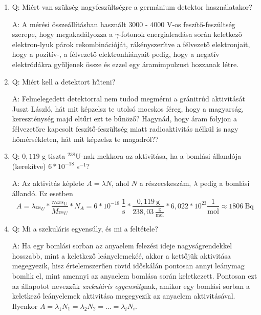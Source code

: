 \begin{enumerate}
    \item Q: Miért van szükség nagyfeszültségre a germánium detektor használatakor?
    \begin{displayquote}
        A: A mérési összeállításban használt $3000$ - $4000$ V-os feszítő-feszültség szerepe, hogy megakadályozza a $\gamma$-fotonok energialeadása során keletkező elektron-lyuk párok rekombinációját, rákényszerítve a félvezető elektronjait, hogy a pozitív-, a félvezető elektronhiányait pedig, hogy a negatív elektródákra gyűljenek össze és ezzel egy áramimpulzust hozzanak létre.
    \end{displayquote}
    
    \item Q: Miért kell a detektort hűteni?
    \begin{displayquote}
        A: Felmelegedett detektorral nem tudod megmérni a gránitrúd aktivitását Juszt László, hát mit képzelsz te utolsó mocskos féreg, hogy a magyarság, kereszténység majd eltűri ezt te bűnöző? Hagynád, hogy áram folyjon a félvezetőre kapcsolt feszítő-feszültség miatt radioaktivitás nélkül is nagy hőmérsékleten, hát mit képzelsz te magadról??
    \end{displayquote}
    
    \item Q: $0,119$ g tiszta $^{238}$U-nak mekkora az aktivitása, ha a bomlási állandója (kerekítve) $6 * 10^{-18}$ s$^{-1}$?
    \begin{displayquote}
        A: Az aktivitás képlete $A = \lambda N$, ahol $N$ a részecskeszám, $\lambda$ pedig a bomlási állandó. Ez esetben
        \begin{equation}
            A
            =
            \lambda_{^{238}U}
            *
            \frac{m_{^{238}U}}{M_{^{238}U}}
            *
            N_{A}
            =
            6 * 10^{-18}\ \frac{1}{\text{s}}
            *
            \frac{0,119\ \text{g}}{238,03\ \frac{\text{g}}{\text{mol}}}
            *
            6,022 * 10^{23} \frac{1}{\text{mol}}
            \approx
            1806\ \text{Bq}
        \end{equation}
    \end{displayquote}
    
    \item Q: Mi a szekuláris egyensúly, és mi a feltétele?
    \begin{displayquote}
        A: Ha egy bomlási sorban az anyaelem felezési ideje nagyságrendekkel hosszabb, mint a keletkező leányelemekéé, akkor a kettőjük aktivitása megegyezik, hisz értelemszerűen rövid időskálán pontosan annyi leánymag bomlik el, mint amennyi az anyaelem bomlása során keletkezett. Pontosan ezt az állapotot nevezzük \emph{szekuláris egyensúly}nak, amikor egy bomlási sorban a keletkező leányelemek aktivitása megegyezik az anyaelem aktivitásával. Ilyenkor $A = \lambda_{1} N_{1} = \lambda_{2} N_{2} = \dots = \lambda_{i} N_{i}$.
    \end{displayquote}
    

\end{enumerate}
